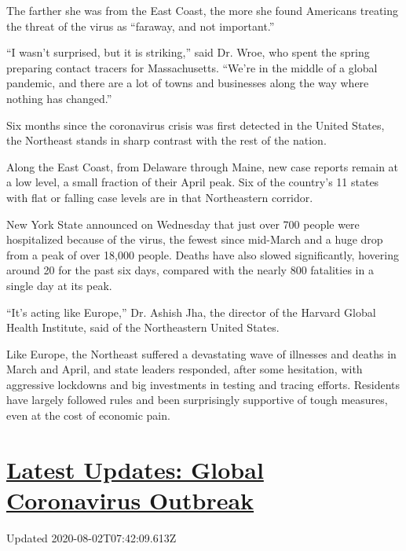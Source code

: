 The farther she was from the East Coast, the more she found Americans
treating the threat of the virus as ``faraway, and not important.''

``I wasn't surprised, but it is striking,'' said Dr. Wroe, who spent the
spring preparing contact tracers for Massachusetts. ``We're in the
middle of a global pandemic, and there are a lot of towns and businesses
along the way where nothing has changed.''

Six months since the coronavirus crisis was first detected in the United
States, the Northeast stands in sharp contrast with the rest of the
nation.

Along the East Coast, from Delaware through Maine, new case reports
remain at a low level, a small fraction of their April peak. Six of the
country's 11 states with flat or falling case levels are in that
Northeastern corridor.

New York State announced on Wednesday that just over 700 people were
hospitalized because of the virus, the fewest since mid-March and a huge
drop from a peak of over 18,000 people. Deaths have also slowed
significantly, hovering around 20 for the past six days, compared with
the nearly 800 fatalities in a single day at its peak.

``It's acting like Europe,'' Dr. Ashish Jha, the director of the Harvard
Global Health Institute, said of the Northeastern United States.

Like Europe, the Northeast suffered a devastating wave of illnesses and
deaths in March and April, and state leaders responded, after some
hesitation, with aggressive lockdowns and big investments in testing and
tracing efforts. Residents have largely followed rules and been
surprisingly supportive of tough measures, even at the cost of economic
pain.

\hypertarget{latest-updates-global-coronavirus-outbreak}{%
\section{\texorpdfstring{\href{https://www.nytimes.com/2020/08/01/world/coronavirus-covid-19.html?action=click\&pgtype=Article\&state=default\&region=MAIN_CONTENT_1\&context=storylines_live_updates}{Latest
Updates: Global Coronavirus
Outbreak}}{Latest Updates: Global Coronavirus Outbreak}}\label{latest-updates-global-coronavirus-outbreak}}

Updated 2020-08-02T07:42:09.613Z

